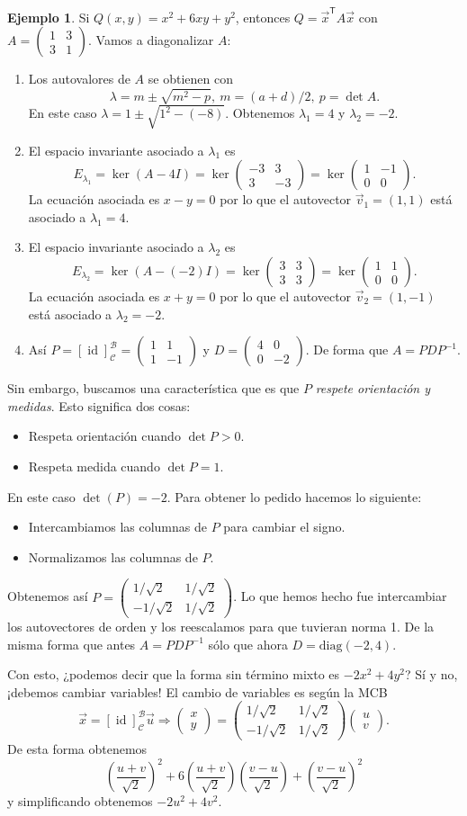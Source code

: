 \documentclass[12pt]{article}
\theoremstyle{plain}
\theoremstyle{definition}
\newtheorem{Ex}[Th]{Ejemplo}           %
\theoremstyle{remark}
\DeclareMathOperator{\id}{id}       %
\newcommand{\la}{\lambda}           %
\newcommand{\cB}{\mathcal{B}}       %
\newcommand{\cC}{\mathcal{C}}       %
\newcommand{\sT}{\mathsf{T}}        %
\renewcommand{\:}{\colon}           %
\renewcommand{\.}{\Cdot}                %
\newcommand{\twobyone}[2]{\begin{pmatrix} %
  #1 \\ #2 \end{pmatrix}}
\newcommand{\twobytwo}[4]{\begin{pmatrix} %
    #1 & #2 \\ #3 & #4 \end{pmatrix}}
\newcommand{\To}{\Rightarrow}
\begin{document}
\begin{multicols}{2}
\begin{Ex} 
Si $Q(x,y)=x^2+6xy+y^2$, entonces $Q=\vec{x}^\sT A\vec{x}$ con $A=\twobytwo{1}{3}{3}{1}$. Vamos a diagonalizar $A$:
\begin{enumerate}
  \itemsep=-0.5em 
  \item Los autovalores de $A$ se obtienen con 
  $$\la=m\pm\sqrt{m^2-p},\ m=(a+d)/2,\ p=\det A.$$
  En este caso $\la=1\pm\sqrt{1^2-(-8)}$. Obtenemos $\la_1=4$ y $\la_2=-2$.
  \item El espacio invariante asociado a $\la_1$ es 
  $$E_{\la_1}=\ker(A-4I)=\ker\twobytwo{-3}{3}{3}{-3}=\ker\twobytwo{1}{-1}{0}{0}.$$
  La ecuación asociada es $x-y=0$ por lo que el autovector $\vec{v}_1=(1,1)$ está asociado a $\la_1=4$.
  \item El espacio invariante asociado a $\la_2$ es 
  $$E_{\la_2}=\ker(A-(-2)I)=\ker\twobytwo{3}{3}{3}{3}=\ker\twobytwo{1}{1}{0}{0}.$$
  La ecuación asociada es $x+y=0$ por lo que el autovector $\vec{v}_2=(1,-1)$ está asociado a $\la_2=-2$.
  \item Así $P=[\id]^\cB_\cC=\twobytwo{1}{1}{1}{-1}$ y $D=\twobytwo{4}{0}{0}{-2}$. De forma que $A=PDP^{-1}$.
\end{enumerate}
Sin embargo, buscamos una característica que es que $P$ \emph{respete orientación y medidas}. Esto significa dos cosas:
\begin{itemize}
  \itemsep=-0.5em
  \item Respeta orientación cuando $\det P>0$.
  \item Respeta medida cuando $\det P=1$.
\end{itemize}
En este caso $\det(P)=-2$. Para obtener lo pedido hacemos lo siguiente:
\begin{itemize}
  \itemsep=-0.5em
  \item Intercambiamos las columnas de $P$ para cambiar el signo.
  \item Normalizamos las columnas de $P$.
\end{itemize}
Obtenemos así $P=\twobytwo{1/\sqrt{2}}{1/\sqrt{2}}{-1/\sqrt{2}}{1/\sqrt{2}}$. Lo que hemos hecho fue intercambiar los autovectores de orden y los reescalamos para que tuvieran norma 1. De la misma forma que antes $A=PDP^{-1}$ sólo que ahora $D=\text{diag}(-2,4)$.\par 
Con esto, ¿podemos decir que la forma sin término mixto es $-2x^2+4y^2$? Sí y no, ¡debemos cambiar variables! El cambio de variables es según la MCB
$$\vec{x}=[\id]^\cB_\cC\vec{u}\To\twobyone{x}{y}=\twobytwo{1/\sqrt{2}}{1/\sqrt{2}}{-1/\sqrt{2}}{1/\sqrt{2}}\twobyone{u}{v}.$$
De esta forma obtenemos 
$$\left(\frac{u + v}{\sqrt2}\right)^2 + 6\left(\frac{u + v}{\sqrt2}\right)\left(\frac{v-u}{\sqrt2}\right)+\left(\frac{v-u}{\sqrt2}\right)^2$$
y simplificando obtenemos $-2u^2+4v^2$.
\end{Ex}


\end{multicols}
\end{document}
